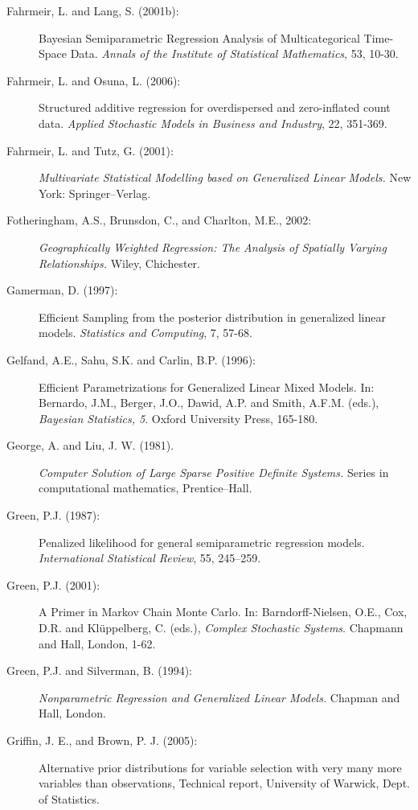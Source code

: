 \documentclass[11pt,a4paper,twoside]{bayesxarticle}
\begin{document}
\begin{description}
\item[Fahrmeir, L. and Lang, S. (2001b):] Bayesian Semiparametric Regression Analysis of Multicategorical
Time-Space Data. {\em Annals of the  Institute of Statistical
Mathematics}, 53, 10-30.

\item[Fahrmeir, L. and Osuna, L. (2006):] Structured additive regression for
overdispersed and zero-inflated count data. {\em Applied Stochastic
Models in Business and Industry}, 22, 351-369.

\item[Fahrmeir, L. and Tutz, G. (2001):] {\em Multivariate Statistical
Modelling based on Generalized Linear Models.} New York:
Springer--Verlag.

\item[Fotheringham, A.S., Brunsdon, C., and Charlton, M.E., 2002:]
{\it Geographically Weighted Regression: The Analysis of Spatially
Varying Relationships.} Wiley, Chichester.

\item[Gamerman, D. (1997):] Efficient Sampling from the posterior distribution
in generalized linear models. {\em Statistics and Computing}, 7,
57-68.

\item[Gelfand, A.E., Sahu, S.K. and Carlin, B.P. (1996):] Efficient Parametrizations for
Generalized Linear Mixed Models. In: Bernardo, J.M., Berger, J.O.,
Dawid, A.P. and Smith, A.F.M. (eds.), {\em Bayesian Statistics,
5}. Oxford University Press, 165-180.

\item[George, A. and Liu, J. W. (1981).] {\em Computer Solution of Large
Sparse Positive Definite Systems.} Series in computational
mathematics, Prentice--Hall.

\item[Green, P.J. (1987):] Penalized
likelihood for general semiparametric regression models. {\it
International Statistical Review}, 55, 245--259.

\item[Green, P.J. (2001):] A Primer in Markov Chain Monte Carlo. In: Barndorff-Nielsen, O.E.,
Cox, D.R. and Kl\"{u}ppelberg, C. (eds.), {\em Complex Stochastic
Systems}. Chapmann and Hall, London, 1-62.

\item[Green, P.J. and Silverman, B. (1994):] {\em Nonparametric Regression and Generalized Linear Models.} Chapman
and Hall, London.

\item[Griffin, J. E., and Brown, P. J. (2005):] Alternative prior distributions 
for variable selection with very many more variables than observations, Technical 
report, University of Warwick, Dept. of Statistics.


\end{description}
\end{document}
